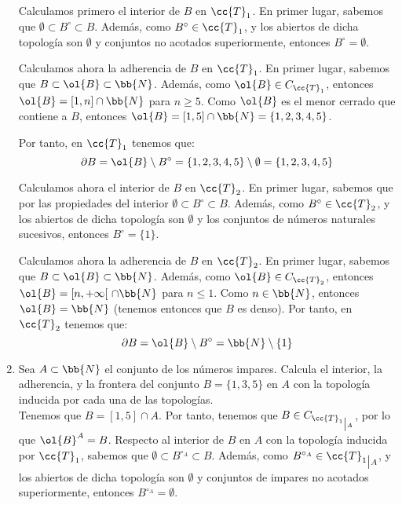 \documentclass[12pt]{article}
\newcommand{\T}[0]{\cc{T}}
\begin{document}
\begin{ejercicio}[6 puntos]
\begin{enumerate}
            Calculamos primero el interior de $B$ en $\T_1$. En primer lugar, sabemos que $\emptyset\subset B^\circ\subset B$. Además, como $B^\circ\in \T_1$, 
            y los abiertos de dicha topología son $\emptyset$ y conjuntos no acotados superiormente, entonces $B^\circ=\emptyset$.

            Calculamos ahora la adherencia de $B$ en $\T_1$. En primer lugar, sabemos que $B\subset \ol{B}\subset \bb{N}$. Además, como $\ol{B}\in C_{\T_1}$, entonces
            $\ol{B}=[1,n]\cap \bb{N}$ para $n\geq 5$. Como $\ol{B}$ es el menor cerrado que contiene a $B$, entonces $\ol{B}=[1,5]\cap \bb{N}=\{1,2,3,4,5\}$.

            Por tanto, en $\T_1$ tenemos que:
            \begin{equation*}
                \partial B = \ol{B}\setminus B^\circ = \{1,2,3,4,5\}\setminus \emptyset = \{1,2,3,4,5\}
            \end{equation*}

            Calculamos ahora el interior de $B$ en $\T_2$. En primer lugar, sabemos que por las propiedades del interior $\emptyset\subset B^\circ\subset B$. Además, como $B^\circ\in \T_2$,
            y los abiertos de dicha topología son $\emptyset$ y los conjuntos de números naturales sucesivos, entonces $B^\circ=\{1\}$.

            Calculamos ahora la adherencia de $B$ en $\T_2$. En primer lugar, sabemos que $B\subset \ol{B}\subset \bb{N}$. Además, como $\ol{B}\in C_{\T_2}$, entonces
            $\ol{B}=[n, +\infty[~\cap \bb{N}$ para $n\leq 1$. Como $n\in \bb{N}$, entonces $\ol{B}=\bb{N}$ (tenemos entonces que $B$ es denso). Por tanto, en $\T_2$ tenemos que:
            \begin{equation*}
                \partial B = \ol{B}\setminus B^\circ = \bb{N}\setminus \{1\}
            \end{equation*}

            \item Sea $A\subset \bb{N}$ el conjunto de los números impares.
            Calcula el interior, la adherencia, y la frontera del conjunto $B=\{1,3,5\}$ en $A$ con la topología inducida por cada una de las topologías.\\

            Tenemos que $B=[1,5]\cap A$. Por tanto, tenemos que $B\in C_{{\T_1}_{\big| A}}$, por lo que $\ol{B}^A = B$.
            Respecto al interior de $B$ en $A$ con la topología inducida por $\T_1$, sabemos que $\emptyset\subset B^{\circ_A}\subset B$. Además, como $B^{\circ_A}\in {\T_1}_{\big| A}$,
            y los abiertos de dicha topología son $\emptyset$ y conjuntos de impares no acotados superiormente, entonces $B^{\circ_A}=\emptyset$.
            

\end{enumerate}
\end{ejercicio}
\end{document}
